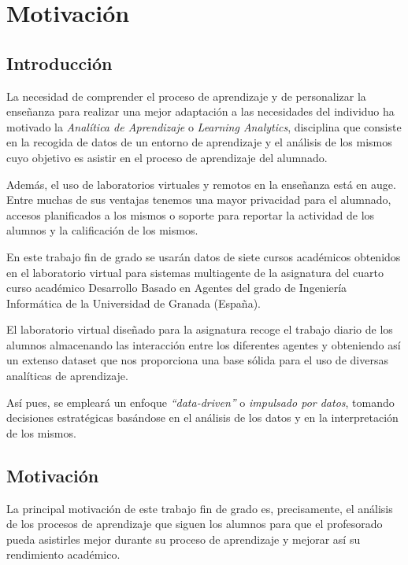 \chapter*{Motivación}\label{sec:motivation}

\section{Introducción}

La necesidad de comprender el proceso de aprendizaje y de personalizar la enseñanza para realizar una mejor adaptación a las necesidades del individuo ha motivado la \emph{Analítica de Aprendizaje} o \emph{Learning Analytics}, disciplina que consiste en la recogida de datos de un entorno de aprendizaje y el análisis de los mismos cuyo objetivo es asistir en el proceso de aprendizaje del alumnado.

Además, el uso de laboratorios virtuales y remotos en la enseñanza está en auge. Entre muchas de sus ventajas tenemos una mayor privacidad para el alumnado, accesos planificados a los mismos o soporte para reportar la actividad de los alumnos y la calificación de los mismos.

En este trabajo fin de grado se usarán datos de siete cursos académicos obtenidos en el laboratorio virtual para sistemas multiagente de la asignatura del cuarto curso académico Desarrollo Basado en Agentes del grado de Ingeniería Informática de la Universidad de Granada (España).

El laboratorio virtual diseñado para la asignatura recoge el trabajo diario de los alumnos almacenando las interacción entre los diferentes agentes y obteniendo así un extenso dataset que nos proporciona una base sólida para el uso de diversas analíticas de aprendizaje.

Así pues, se empleará un enfoque \emph{``data-driven''} o \emph{impulsado por datos}, tomando decisiones estratégicas basándose en el análisis de los datos y en la interpretación de los mismos.

\section{Motivación}

La principal motivación de este trabajo fin de grado es, precisamente, el análisis de los procesos de aprendizaje que siguen los alumnos para que el profesorado pueda asistirles mejor durante su proceso de aprendizaje y mejorar así su rendimiento académico.

